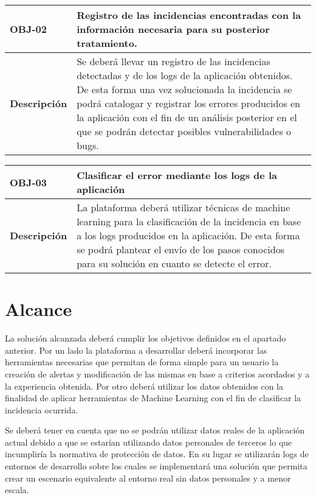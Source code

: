 \begin{table}[H]
\centering
\renewcommand{\arraystretch}{1.5}
\begin{tabular}{| p{2.5cm} | p{10cm} |}
\hline

\bf{OBJ-02} \cellcolor{Gray} & \textbf{Registro de las incidencias encontradas con la información necesaria para su posterior
tratamiento.} \\
\hline
\bf{Descripción} \cellcolor{Gray} & Se deberá llevar un registro de las incidencias detectadas y de los logs de la aplicación obtenidos. De esta forma una vez solucionada la incidencia se podrá catalogar y registrar los errores producidos en la aplicación con el fin de un análisis posterior en el que se podrán detectar posibles vulnerabilidades o bugs.
\\
\hline
\end{tabular}
\end{table}

\begin{table}[H]
\centering
\renewcommand{\arraystretch}{1.5}
\begin{tabular}{| p{2.5cm} | p{10cm} |}
\hline

\bf{OBJ-03} \cellcolor{Gray} & \textbf{Clasificar el error mediante los logs de la aplicación} \\
\hline
\bf{Descripción} \cellcolor{Gray} & La plataforma deberá utilizar técnicas de machine learning para la clasificación de la incidencia en base a los logs producidos en la aplicación. De esta forma se podrá plantear el envío de los pasos conocidos para su solución en cuanto se detecte el error.
\\
\hline
\end{tabular}
\end{table}


\section{Alcance}

La solución alcanzada deberá cumplir los objetivos definidos en el apartado anterior. Por un lado la plataforma a desarrollar deberá incorporar las herramientas necesarias que permitan de forma simple para un usuario la creación de alertas y modificación de las mismas en base a criterios acordados y a la experiencia obtenida. Por otro deberá utilizar los datos obtenidos con la finalidad de aplicar herramientas de Machine Learning con el fin de clasificar la incidencia ocurrida.

Se deberá tener en cuenta que no se podrán utilizar datos reales de la aplicación actual debido a que se estarían utilizando datos personales de terceros lo que incumpliría la normativa de protección de datos. En su lugar se utilizarán logs de entornos de desarrollo sobre los cuales se implementará una solución que permita crear un escenario equivalente al entorno real sin datos personales y a menor escala.


